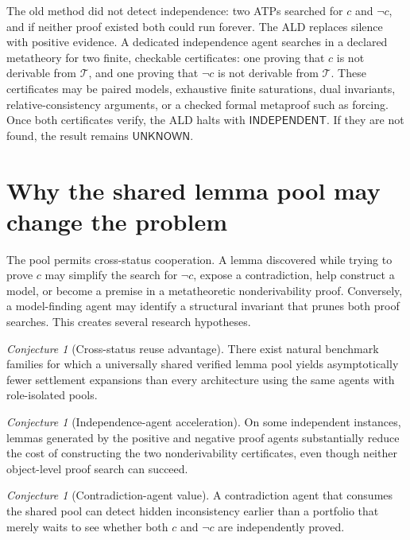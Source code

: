 \documentclass[11pt]{article}
\theoremstyle{definition}
\theoremstyle{remark}
\newtheorem{conjecture}[theorem]{Conjecture}
\newcommand{\T}{\mathcal T}
\newcommand{\Ind}{\mathsf{INDEPENDENT}}
\newcommand{\Unknown}{\mathsf{UNKNOWN}}
\begin{document}
\begin{notebox}
The old method did not detect independence: two ATPs searched for $c$ and $\neg c$, and if neither proof existed both could run forever. The ALD replaces silence with positive evidence. A dedicated independence agent searches in a declared metatheory for two finite, checkable certificates: one proving that $c$ is not derivable from $\T$, and one proving that $\neg c$ is not derivable from $\T$. These certificates may be paired models, exhaustive finite saturations, dual invariants, relative-consistency arguments, or a checked formal metaproof such as forcing. Once both certificates verify, the ALD halts with $\Ind$. If they are not found, the result remains $\Unknown$.
\end{notebox}

\section{Why the shared lemma pool may change the problem}

The pool permits cross-status cooperation. A lemma discovered while trying to prove $c$ may simplify the search for $\neg c$, expose a contradiction, help construct a model, or become a premise in a metatheoretic nonderivability proof. Conversely, a model-finding agent may identify a structural invariant that prunes both proof searches. This creates several research hypotheses.

\begin{conjecture}[Cross-status reuse advantage]
There exist natural benchmark families for which a universally shared verified lemma pool yields asymptotically fewer settlement expansions than every architecture using the same agents with role-isolated pools.
\end{conjecture}

\begin{conjecture}[Independence-agent acceleration]
On some independent instances, lemmas generated by the positive and negative proof agents substantially reduce the cost of constructing the two nonderivability certificates, even though neither object-level proof search can succeed.
\end{conjecture}

\begin{conjecture}[Contradiction-agent value]
A contradiction agent that consumes the shared pool can detect hidden inconsistency earlier than a portfolio that merely waits to see whether both $c$ and $\neg c$ are independently proved.
\end{conjecture}
\end{document}
